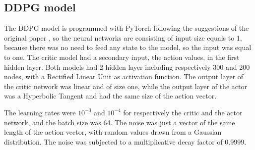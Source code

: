 \subsection{DDPG model} 
\label{appendix_b}
The DDPG model is programmed with PyTorch \cite{pytorch} following the suggestions of the original paper \cite{lillicrap}, so the neural networks are consisting of input size equals to 1, because there was no need to feed any state to the model, so the input was equal to one. The critic model had a secondary input, the action values, in the first hidden layer. Both models had 2 hidden layer including respectively 300 and 200 nodes, with a Rectified Linear Unit as activation function. The output layer of the critic network was linear and of size one, while the output layer of the actor was a Hyperbolic Tangent and had the same size of the action vector.

The learning rates were $10^{-3}$ and $10^{-4}$ for respectively the critic and the actor network, and the batch size was 64. The noise was just a vector of the same length of the action vector, with random values drawn from a Gaussian distribution. The noise was subjected to a multiplicative decay factor of 0.9999. 


